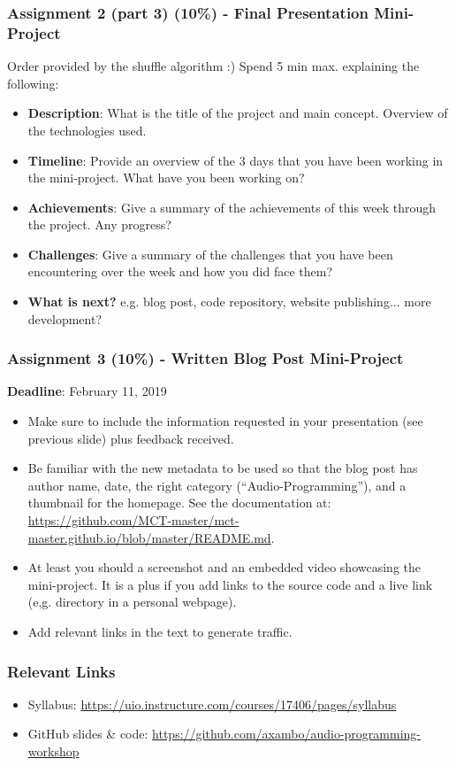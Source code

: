 \documentclass[screen, aspectratio=43]{beamer}
\begin{document}
%
\begin{frame}
\frametitle{Assignment 2 (part 3) (10\%) - Final Presentation Mini-Project}
Order provided by the shuffle algorithm :)
Spend 5 min max. explaining the following:
\begin{itemize}
\item \textbf{Description}: What is the title of the project and main concept. Overview of the technologies used.
\item \textbf{Timeline}: Provide an overview of the 3 days that you have been working in the mini-project. What have you been working on?
\item \textbf{Achievements}: Give a summary of the achievements of this week through the project. Any progress?
\item \textbf{Challenges}: Give a summary of the challenges that you have been encountering over the week and how you did face them?
\item \textbf{What is next?} e.g. blog post, code repository, website publishing... more development?
\end{itemize}
\end{frame}
%
\begin{frame}
\frametitle{Assignment 3 (10\%) - Written Blog Post Mini-Project}
\textbf{Deadline}: February 11, 2019
\begin{itemize}
\item Make sure to include the information requested in your presentation (see previous slide) plus feedback received.
\item Be familiar with the new metadata to be used so that the blog post has author name, date, the right category (``Audio-Programming''), and a thumbnail for the homepage. See the documentation at: \url{https://github.com/MCT-master/mct-master.github.io/blob/master/README.md}.
\item At least you should a screenshot and an embedded video showcasing the mini-project. It is a plus if you add links to the source code and a live link (e,g. directory in a personal webpage).
\item Add relevant links in the text to generate traffic.
\end{itemize}
\end{frame}
%
\begin{frame}
\frametitle{Relevant Links}
\begin{itemize}
\item Syllabus: \url{https://uio.instructure.com/courses/17406/pages/syllabus}
\item GitHub slides \& code: \url{https://github.com/axambo/audio-programming-workshop}
\end{itemize}
\end{frame}
%
%
\end{document}
